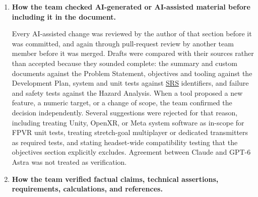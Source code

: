 \documentclass[12pt, titlepage]{article}
\begin{document}
\begin{enumerate}
    \item \textbf{How the team checked AI-generated or AI-assisted material
    before including it in the document.}

    Every AI-assisted change was reviewed by the author of that section
    before it was committed, and again through pull-request review by
    another team member before it was merged. Drafts were compared with
    their sources rather than accepted because they sounded complete: the
    summary and custom documents against the Problem Statement, objectives
    and tooling against the Development Plan, system and unit tests against
    \hyperlink{abbr:SRS}{SRS} identifiers, and failure and safety tests against the Hazard
    Analysis. When a tool proposed a new feature, a numeric target, or a
    change of scope, the team confirmed the decision independently. Several
    suggestions were rejected for that reason, including treating Unity,
    OpenXR, or Meta system software as in-scope for FPVR unit tests,
    treating stretch-goal multiplayer or dedicated transmitters as required
    tests, and stating headset-wide compatibility testing that the
    objectives section explicitly excludes. Agreement between Claude and
    GPT-6 Astra was not treated as verification.

    \item \textbf{How the team verified factual claims, technical
    assertions, requirements, calculations, and references.}


\end{enumerate}
\end{document}
